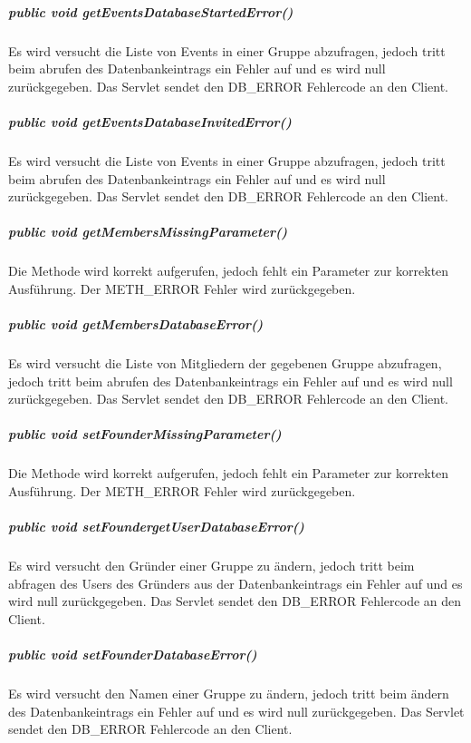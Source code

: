 \documentclass{scrartcl}
\begin{document}
\subparagraph{public void getEventsDatabaseStartedError()}
Es wird versucht die Liste von Events in einer Gruppe abzufragen, jedoch tritt beim abrufen des Datenbankeintrags ein Fehler auf und es wird null zurückgegeben. Das Servlet sendet den DB\_ERROR Fehlercode an den Client.
\subparagraph{public void getEventsDatabaseInvitedError()}
Es wird versucht die Liste von Events in einer Gruppe abzufragen, jedoch tritt beim abrufen des Datenbankeintrags ein Fehler auf und es wird null zurückgegeben. Das Servlet sendet den DB\_ERROR Fehlercode an den Client.
\subparagraph{public void getMembersMissingParameter()}
Die Methode wird korrekt aufgerufen, jedoch fehlt ein Parameter zur korrekten Ausführung. Der METH\_ERROR Fehler wird zurückgegeben.
\subparagraph{public void getMembersDatabaseError()}
Es wird versucht die Liste von Mitgliedern der gegebenen Gruppe abzufragen, jedoch tritt beim abrufen des Datenbankeintrags ein Fehler auf und es wird null zurückgegeben. Das Servlet sendet den DB\_ERROR Fehlercode an den Client.
\subparagraph{public void setFounderMissingParameter()}
Die Methode wird korrekt aufgerufen, jedoch fehlt ein Parameter zur korrekten Ausführung. Der METH\_ERROR Fehler wird zurückgegeben.
\subparagraph{public void setFoundergetUserDatabaseError()}
Es wird versucht den Gründer einer Gruppe zu ändern, jedoch tritt beim abfragen des Users des Gründers aus der Datenbankeintrags ein Fehler auf und es wird null zurückgegeben. Das Servlet sendet den DB\_ERROR Fehlercode an den Client.
\subparagraph{public void setFounderDatabaseError()}
Es wird versucht den Namen einer Gruppe zu ändern, jedoch tritt beim ändern des Datenbankeintrags ein Fehler auf und es wird null zurückgegeben. Das Servlet sendet den DB\_ERROR Fehlercode an den Client.
\newpage
\end{document}
